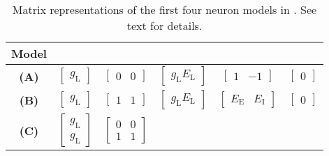 \begin{table}
	\caption[Matrix representations of the first four neuron models in ]{Matrix representations of the first four neuron models in . See text for details.
	}
	\label{tbl:nlif_matrices}
	\small\sffamily\centering
	\begin{tabular}{c c c c c c}
		\toprule
		\multicolumn{1}{c}{\textbf{Model}} & \vnap & \mnAp & \vnbp & \mnBp & \mnL \\
		\midrule
			\textbf{(A)}
			& $\displaystyle \begin{bmatrix} g_\mathrm{L} \end{bmatrix}$
			& $\displaystyle \begin{bmatrix} 0 & 0 \end{bmatrix}$
			& $\displaystyle \begin{bmatrix} g_\mathrm{L} E_\mathrm{L} \end{bmatrix}$
			& $\displaystyle \begin{bmatrix} 1 & -1 \end{bmatrix}$
			& $\displaystyle \begin{bmatrix} 0 \end{bmatrix}$\\[0.5cm]
			\textbf{(B)} 
			& $\displaystyle \begin{bmatrix} g_\mathrm{L} \end{bmatrix}$
			& $\displaystyle \begin{bmatrix} 1 & 1 \end{bmatrix}$
			& $\displaystyle \begin{bmatrix} g_\mathrm{L} E_\mathrm{L} \end{bmatrix}$
			& $\displaystyle \begin{bmatrix} E_\mathrm{E} & E_\mathrm{I} \end{bmatrix}$
			& $\displaystyle \begin{bmatrix} 0 \end{bmatrix}$ \\[0.5cm]
			\textbf{(C)} 
			& $\displaystyle \begin{bmatrix}
				g_\mathrm{L} \\ g_\mathrm{L}
			\end{bmatrix}$
			& $\displaystyle \begin{bmatrix} 0 & 0 \\
				1 & 1 \end{bmatrix}$

\end{tabular}
\end{table}
